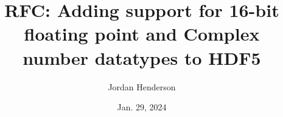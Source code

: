 \documentclass[letterpaper,rfc,hyper]{HDF5_RFC}
\title{RFC: Adding support for 16-bit floating point and Complex number datatypes to HDF5}
\author{Jordan Henderson}
\date{Jan. 29, 2024}
\begin{document}
\maketitle



\newpage
\tableofcontents

\newpage







\newpage




\makerevisions




\appendix


\end{document}
